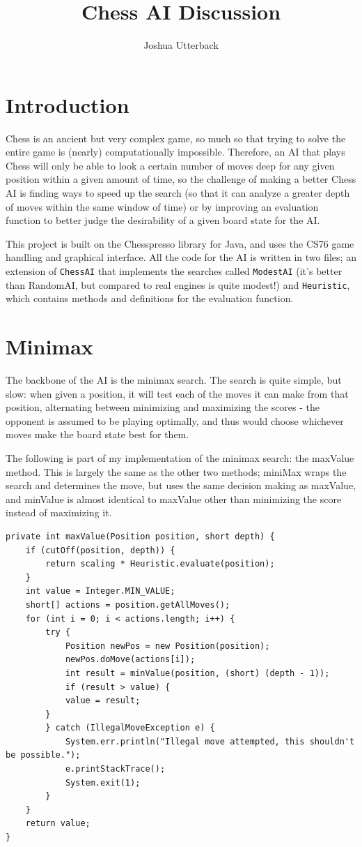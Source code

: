 \documentclass[10pt]{article}
\title{Chess AI Discussion}
\author{Joshua Utterback}
\begin{document}
\maketitle

\section{Introduction}
Chess is an ancient but very complex game, so much so that trying to solve the entire game is (nearly) computationally impossible. Therefore, an AI that plays Chess will only be able to look a certain number of moves deep for any given position within a given amount of time, so the challenge of making a better Chess AI is finding ways to speed up the search (so that it can analyze a greater depth of moves within the same window of time) or by improving an evaluation function to better judge the desirability of a given board state for the AI. 

This project is built on the Chesspresso library for Java, and uses the CS76 game handling and graphical interface. All the code for the AI is written in two files; an extension of \verb|ChessAI| that implements the searches called \verb|ModestAI| (it's better than RandomAI, but compared to real engines is quite modest!) and \verb|Heuristic|, which contains methods and definitions for the evaluation function.


\section{Minimax}
The backbone of the AI is the minimax search. The search is quite simple, but slow: when given a position, it will test each of the moves it can make from that position, alternating between minimizing and maximizing the scores - the opponent is assumed to be playing optimally, and thus would choose whichever moves make the board state best for them. 

The following is part of my implementation of the minimax search: the maxValue method. This is largely the same as the other two methods; miniMax wraps the search and determines the move, but uses the same decision making as maxValue, and minValue is almost identical to maxValue other than minimizing the score instead of maximizing it. 

\begin{lstlisting}
private int maxValue(Position position, short depth) {
	if (cutOff(position, depth)) {
		return scaling * Heuristic.evaluate(position);
	}
	int value = Integer.MIN_VALUE;
	short[] actions = position.getAllMoves();
	for (int i = 0; i < actions.length; i++) {
		try {
			Position newPos = new Position(position);
			newPos.doMove(actions[i]);
			int result = minValue(position, (short) (depth - 1));
			if (result > value) {
			value = result;
		}
		} catch (IllegalMoveException e) {
			System.err.println("Illegal move attempted, this shouldn't be possible.");
			e.printStackTrace();
			System.exit(1);
		}
	}
	return value;
}
\end{lstlisting}
\end{document}
